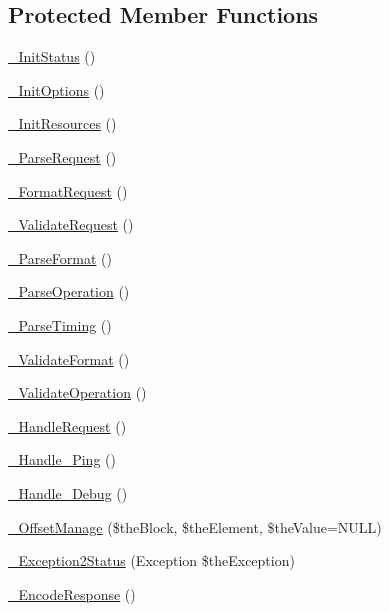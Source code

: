 \subsection*{Protected Member Functions}
\begin{DoxyCompactItemize}
\item 
\hyperlink{class_c_wrapper_a8369eec2e53b3f6394a35bcd919d8779}{\-\_\-\-Init\-Status} ()
\item 
\hyperlink{class_c_wrapper_aec2fa3594e36a380d66743b47c24490c}{\-\_\-\-Init\-Options} ()
\item 
\hyperlink{class_c_wrapper_a0e5c5488fce4b388e43dcf6810874d74}{\-\_\-\-Init\-Resources} ()
\item 
\hyperlink{class_c_wrapper_a6675c744053f1b05547ad28fc50a79e6}{\-\_\-\-Parse\-Request} ()
\item 
\hyperlink{class_c_wrapper_a2a3d95961650654468789883ab1607e5}{\-\_\-\-Format\-Request} ()
\item 
\hyperlink{class_c_wrapper_a24b22cfd0022c1cba1741fb294fba5ba}{\-\_\-\-Validate\-Request} ()
\item 
\hyperlink{class_c_wrapper_a53d59f3a61137b8d6f5707d794e2961a}{\-\_\-\-Parse\-Format} ()
\item 
\hyperlink{class_c_wrapper_aa090c135ca1085f46d8cddd393131ea6}{\-\_\-\-Parse\-Operation} ()
\item 
\hyperlink{class_c_wrapper_a13421345af75888b1fa8bcd3381b52a5}{\-\_\-\-Parse\-Timing} ()
\item 
\hyperlink{class_c_wrapper_a8994ff7a5f94438da1c5e3505b145dbd}{\-\_\-\-Validate\-Format} ()
\item 
\hyperlink{class_c_wrapper_aab3f7b2ca4cd9e692c35510d753918a4}{\-\_\-\-Validate\-Operation} ()
\item 
\hyperlink{class_c_wrapper_a12c1dd1f1d1cf0ae889cc19ff17ced0e}{\-\_\-\-Handle\-Request} ()
\item 
\hyperlink{class_c_wrapper_ab58ee7076059e0f992c2a642043b764f}{\-\_\-\-Handle\-\_\-\-Ping} ()
\item 
\hyperlink{class_c_wrapper_aeb5d93905928781ccaba5718be9b123a}{\-\_\-\-Handle\-\_\-\-Debug} ()
\item 
\hyperlink{class_c_wrapper_aff9eb1799c8f30cb33967c7a50ce6395}{\-\_\-\-Offset\-Manage} (\$the\-Block, \$the\-Element, \$the\-Value=N\-U\-L\-L)
\item 
\hyperlink{class_c_wrapper_ad8dd05c155df0d8fe19be35d4bb67b56}{\-\_\-\-Exception2\-Status} (Exception \$the\-Exception)
\item 
\hyperlink{class_c_wrapper_a60583bacf329d484d01df9851602759f}{\-\_\-\-Encode\-Response} ()
\end{DoxyCompactItemize}
